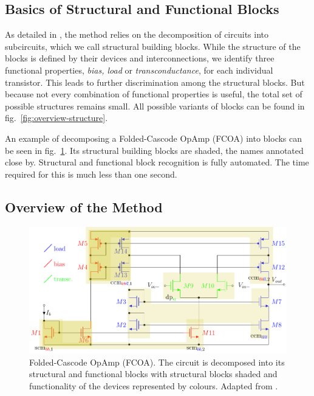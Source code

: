 \documentclass[conference]{IEEEtran}
\begin{document}
 	\subsection{Basics of Structural and Functional Blocks}
 	As detailed in \cite{ leibl24inverse}, the method  relies on the decomposition of circuits into subcircuits, which we call structural building blocks.
 	While the structure of the blocks is defined by their devices and interconnections, we identify three functional properties, \textit{bias, load} or \textit{transconductance}, for each individual transistor. This leads to further discrimination among the structural blocks. But because not every combination of functional properties is useful, the total set of possible structures remains small. 
	All possible variants of blocks can be found in fig.~\ref{fig:overview-structure}.
	
	An example of decomposing a Folded-Cascode OpAmp (FCOA) into blocks can be seen in fig.~\ref{fig:simple53}. Its structural building blocks are shaded, the names annotated close by.
	Structural and functional block recognition is fully automated. The time required for this is much less than one second. 
	
\subsection{Overview of the Method}
	\begin{figure}[]
		\centering
		\includegraphics[width=\linewidth]{figures/simple52_partitioning}
		\caption{Folded-Cascode OpAmp (FCOA). The circuit is decomposed into its structural and functional blocks with structural blocks shaded and functionality of the devices represented by colours. Adapted from \cite{leibl24inverse}.}
		\label{fig:simple53}
	\end{figure}
	
\end{document}
